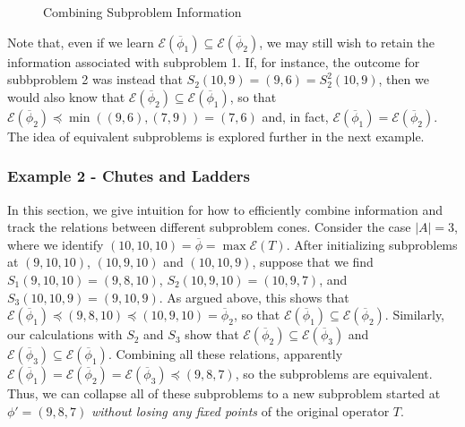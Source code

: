 \documentclass[11pt,reqno]{amsart}
\theoremstyle{definition}
\numberwithin{equation}{section}
\newcommand{\ol}{\overline}
\newcommand{\pre}{\phi}
\newcommand{\sub}{\subseteq}
\newcommand{\fix}{\mathcal{E}}
\newcommand{\peq}{\preceq}
\newcommand{\toppre}{\ol{\pre}}
\begin{document}
\begin{figure} \label{fig:rectangles}
\caption{Combining Subproblem Information}
\end{figure}

Note that, even if we learn $\fix(\toppre_1) \sub \fix(\toppre_2)$, we may still wish to retain the information associated with subproblem 1. 
If, for instance, the outcome for subbproblem 2 was instead that $S_2(10,9) =  (9,6) = S_2^2(10,9)$, then we would also know that $\fix(\toppre_2) \sub \fix(\toppre_1)$, so that $\fix(\toppre_2) \peq \min((9,6),(7,9)) = (7,6)$ and, in fact, $\fix(\toppre_1) = \fix(\toppre_2)$.
The idea of equivalent subproblems is explored further in the next example. 

\subsubsection{Example 2 - Chutes and Ladders}
In this section, we give intuition for how to efficiently combine information and track the relations between different subproblem cones. 
Consider the case $|A| = 3$, where we identify $(10,10,10) = \toppre = \max \fix(T)$. 
After initializing subproblems at $(9,10,10)$, $(10,9,10)$ and $(10,10,9)$, suppose that we find $S_1(9,10,10) = (9,8,10)$, $S_2(10,9,10) = (10,9,7)$, and $S_3(10,10,9) = (9,10,9)$. 
As argued above, this shows that $\fix(\toppre_1) \peq (9,8,10) \peq (10,9,10) = \toppre_2$, so that $\fix(\toppre_1) \sub \fix(\toppre_2)$. 
Similarly, our calculations with $S_2$ and $S_3$ show that $\fix(\toppre_2) \sub \fix(\toppre_3)$ and $\fix(\toppre_3) \sub \fix(\toppre_1)$. 
Combining all these relations, apparently $\fix(\toppre_1) = \fix(\toppre_2) = \fix(\toppre_3) \peq (9,8,7)$, so the subproblems are equivalent.  
Thus, we can collapse all of these subproblems to a new subproblem started at $\pre' = (9,8,7)$ \emph{without losing any fixed points} of the original operator $T$. 
\end{document}
